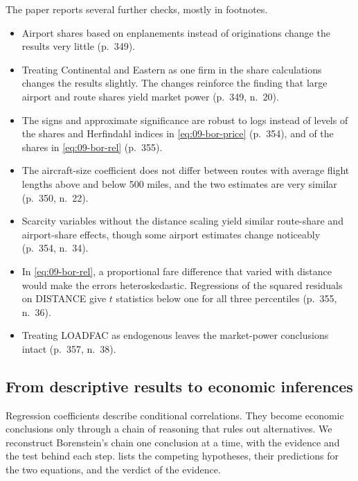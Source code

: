  The paper reports several further checks, mostly in footnotes.
\begin{itemize}
\item Airport shares based on enplanements instead of originations change the results very little (p.~349).
\item Treating Continental and Eastern as one firm in the share calculations changes the results slightly. The
changes reinforce the finding that large airport and route shares yield market power (p.~349, n.~20).
\item The signs and approximate significance are robust to logs instead of levels of the shares and Herfindahl
indices in \cref{eq:09-bor-price} (p.~354), and of the shares in \cref{eq:09-bor-rel} (p.~355).
\item The aircraft-size coefficient does not differ between routes with average flight lengths above and below
500 miles, and the two estimates are very similar (p.~350, n.~22).
\item Scarcity variables without the distance scaling yield similar route-share and airport-share effects,
though some airport estimates change noticeably (p.~354, n.~34).
\item In \cref{eq:09-bor-rel}, a proportional fare difference that varied with distance would make the errors
heteroskedastic. Regressions of the squared residuals on DISTANCE give $t$ statistics below one for all three
percentiles (p.~355, n.~36).
\item Treating LOADFAC as endogenous leaves the market-power conclusions intact (p.~357, n.~38).
\end{itemize}

\subsection{From descriptive results to economic inferences}\label{sec:09-bor-inference}

Regression coefficients describe conditional correlations. They become economic conclusions only through a
chain of reasoning that rules out alternatives. We reconstruct Borenstein's chain one conclusion at a time,
with the evidence and the test behind each step.  lists the competing hypotheses, their
predictions for the two equations, and the verdict of the evidence.

